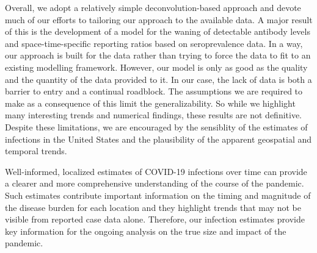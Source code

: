 Overall, we adopt a relatively simple deconvolution-based approach and devote
much of our efforts to tailoring our approach to the available data. A major
result of this is the development of a model for the waning of detectable
antibody levels and space-time-specific reporting ratios based on seroprevalence
data. In a way, our approach is built for the data rather than trying to force
the data to fit to an existing modelling framework. However, our model is only
as good as the quality and the quantity of the data provided to it. In our case,
the lack of data is both a barrier to entry and a continual roadblock. The
assumptions we are required to make as a consequence of this limit the
generalizability. So while we highlight many interesting trends and numerical
findings, these results are not definitive. Despite these limitations, we are
encouraged by the sensiblity of the estimates of infections in the United States
and the plausibility of the apparent geospatial and temporal trends. 
 




Well-informed, localized estimates of COVID-19 infections over time can provide
a clearer and more comprehensive understanding of the course of the pandemic.
Such estimates contribute important information on the timing and magnitude of
the disease burden for each location and they highlight trends that may not be
visible from reported case data alone. Therefore, our infection estimates
provide key information for the ongoing analysis on the true size and impact of
the pandemic.
